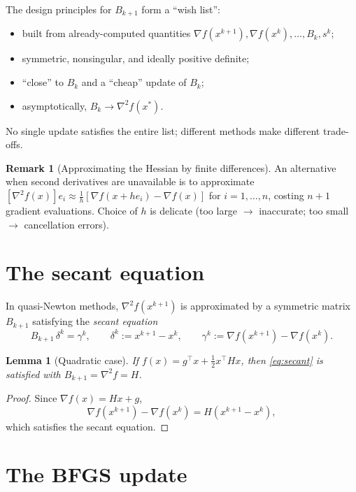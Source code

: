 \documentclass[11pt,a4paper]{report}
\theoremstyle{plain}
\newtheorem{lemma}[theorem]{Lemma}
\theoremstyle{definition}
\newtheorem{remark}[theorem]{Remark}
\newcommand{\grad}{\nabla}
\newcommand{\hess}{\nabla^{2}}
\newcommand{\trans}{^{\top}}
\begin{document}
The design principles for $B_{k+1}$ form a ``wish list'':
\begin{itemize}[leftmargin=2em,itemsep=0pt]
  \item built from already-computed quantities $\grad f(x^{k+1}),\grad f(x^{k}),
        \dots,B_{k},s^{k}$;
  \item symmetric, nonsingular, and ideally positive definite;
  \item ``close'' to $B_{k}$ and a ``cheap'' update of $B_{k}$;
  \item asymptotically, $B_{k}\to\hess f(x^{*})$.
\end{itemize}
No single update satisfies the entire list; different methods make different
trade-offs.

\begin{remark}[Approximating the Hessian by finite differences]
An alternative when second derivatives are unavailable is to approximate
$[\hess f(x)]e_{i}\approx \frac{1}{h}[\grad f(x+he_{i})-\grad f(x)]$ for
$i=1,\dots,n$, costing $n+1$ gradient evaluations. Choice of $h$ is delicate (too
large $\to$ inaccurate; too small $\to$ cancellation errors).
\end{remark}

\section{The secant equation}

In quasi-Newton methods, $\hess f(x^{k+1})$ is approximated by a symmetric matrix
$B_{k+1}$ satisfying the \emph{secant equation}
\begin{equation}\label{eq:secant}
B_{k+1}\,\delta^{k}=\gamma^{k},
\qquad \delta^{k}:=x^{k+1}-x^{k},
\qquad \gamma^{k}:=\grad f(x^{k+1})-\grad f(x^{k}).
\end{equation}

\begin{lemma}[Quadratic case]\label{lem:secant-quad}
If $f(x)=g\trans x+\tfrac12 x\trans Hx$, then \eqref{eq:secant} is satisfied with
$B_{k+1}=\hess f=H$.
\end{lemma}
\begin{proof}
  Since $\grad f(x) = Hx + g$,
  \[
    \grad f(x^{k+1}) - \grad f(x^{k}) = H(x^{k+1} - x^{k}),
  \]
  which satisfies the secant equation.
\end{proof}

\section{The BFGS update}
\end{document}
